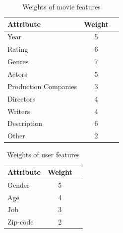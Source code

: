 \documentclass{sigish}
\begin{document}
\begin{table}[]
\centering
\begin{tabular}{|l|c|c|}
\hline
\textbf{Attribute} & \textbf{Weight} \\ \hline
Year             & 5               \\ \hline
Rating             & 6               \\ \hline
Genres             & 7               \\ \hline
Actors             & 5               \\ \hline
Production Companies             & 3               \\ \hline
Directors             & 4               \\ \hline
Writers             & 4               \\ \hline
Description             & 6               \\ \hline
Other             & 2               \\ \hline
\end{tabular}
\caption{Weights of movie features}
\label{tab:movie_weights}
\end{table}

\begin{table}[]
	\centering
	\begin{tabular}{|l|c|c|}
		\hline
		\textbf{Attribute} & \textbf{Weight} \\ \hline
		Gender             & 5               \\ \hline
		Age             & 4               \\ \hline
		Job             & 3               \\ \hline
		Zip-code             & 2               \\ \hline
	\end{tabular}
	\caption{Weights of user features}
	\label{tab:user_weights}
\end{table}
\end{document}
